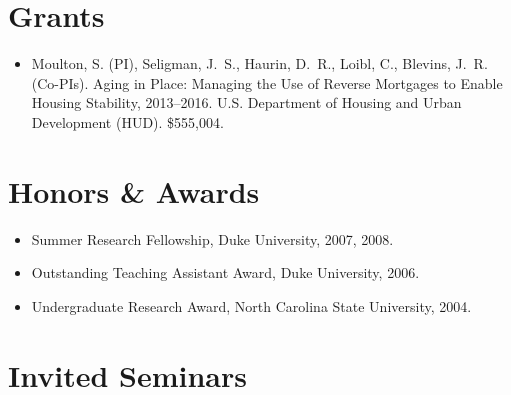 \documentclass[10pt,letterpaper]{article}
\begin{document}
\section*{Grants}

\begin{itemize}
\item Moulton, S. (PI),
Seligman, J.~S., Haurin, D.~R., Loibl, C., Blevins, J.~R. (Co-PIs).
Aging in Place: Managing the Use of Reverse Mortgages to Enable Housing Stability,
2013--2016.
U.S. Department of Housing and Urban Development (HUD).
\$555,004.
\end{itemize}

\section*{Honors \& Awards}

\begin{itemize}
\item Summer Research Fellowship, Duke University, 2007, 2008.
\item Outstanding Teaching Assistant Award, Duke University, 2006.
\item Undergraduate Research Award, North Carolina State University, 2004.
\end{itemize}

\section*{Invited Seminars}
\end{document}
